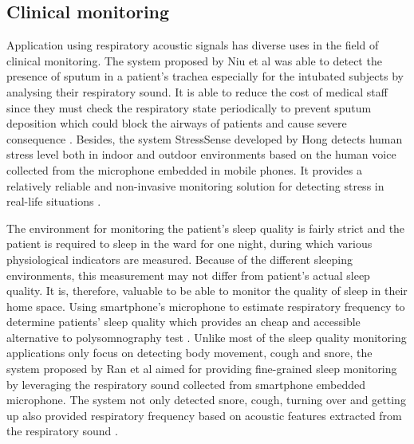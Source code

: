 \subsection{Clinical monitoring}
Application using respiratory acoustic signals has diverse uses in the field of clinical monitoring. The system proposed by Niu et al was able to detect the presence of sputum in a patient’s trachea especially for the intubated subjects by analysing their respiratory sound. It is able to reduce the cost of medical staff since they must check the respiratory state periodically to prevent sputum deposition which could block the airways of patients and cause severe consequence \cite{Niu2019AState}. Besides, the system StressSense developed by Hong detects human stress level both in indoor and outdoor environments based on the human voice collected from the microphone embedded in mobile phones. It provides a relatively reliable and non-invasive monitoring solution for detecting stress in real-life situations \cite{Lu2012StressSense:Smartphones}.

The environment for monitoring the patient's sleep quality is fairly strict and the patient is required to sleep in the ward for one night, during which various physiological indicators are measured. Because of the different sleeping environments, this measurement may not differ from patient's actual sleep quality. It is, therefore, valuable to be able to monitor the quality of sleep in their home space. Using smartphone’s microphone to estimate respiratory frequency to determine patients’ sleep quality which provides an cheap and accessible alternative to polysomnography test \cite{Kaur2017UseRespiration}. Unlike most of the sleep quality monitoring applications only focus on detecting body movement, cough and snore, the system proposed by Ran et al aimed for providing fine-grained sleep monitoring by leveraging the respiratory sound collected from smartphone embedded microphone. The system not only detected snore, cough, turning over and getting up also provided respiratory frequency based on acoustic features extracted from the respiratory sound \cite{Ren2015Fine-grainedSmartphones}.

